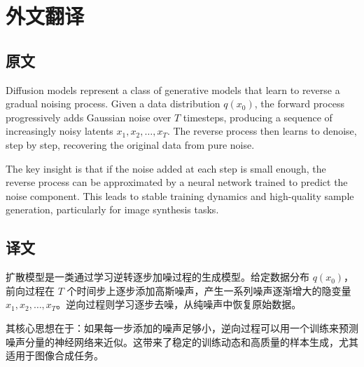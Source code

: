 \chapter*{外文翻译}

\section*{原文}

Diffusion models represent a class of generative models that learn to reverse a gradual noising process. Given a data distribution $q(x_0)$, the forward process progressively adds Gaussian noise over $T$ timesteps, producing a sequence of increasingly noisy latents $x_1, x_2, \ldots, x_T$. The reverse process then learns to denoise, step by step, recovering the original data from pure noise.

The key insight is that if the noise added at each step is small enough, the reverse process can be approximated by a neural network trained to predict the noise component. This leads to stable training dynamics and high-quality sample generation, particularly for image synthesis tasks.

\section*{译文}

扩散模型是一类通过学习逆转逐步加噪过程的生成模型。给定数据分布 $q(x_0)$，前向过程在 $T$ 个时间步上逐步添加高斯噪声，产生一系列噪声逐渐增大的隐变量 $x_1, x_2, \ldots, x_T$。逆向过程则学习逐步去噪，从纯噪声中恢复原始数据。

其核心思想在于：如果每一步添加的噪声足够小，逆向过程可以用一个训练来预测噪声分量的神经网络来近似。这带来了稳定的训练动态和高质量的样本生成，尤其适用于图像合成任务。

